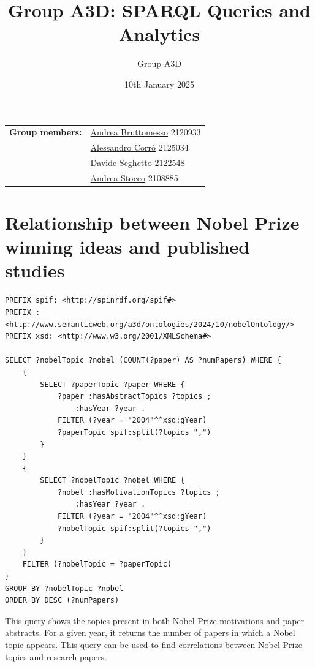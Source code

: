 \documentclass{article}
\title{Group A3D: SPARQL Queries and Analytics}
\author{Group A3D}
\date{10th January 2025}
\begin{document}
\maketitle

\begin{tabular}{@{}ll}
	\textbf{Group members:}
	 & \href{mailto:andrea.bruttomesso.1@studenti.unipd.it}{Andrea Bruttomesso} 2120933 \\
	 & \href{mailto:alessandro.corro.1@studenti.unipd.it}{Alessandro Corr\`o} 2125034   \\
	 & \href{mailto:davide.seghetto@studenti.unipd.it}{Davide Seghetto} 2122548         \\
	 & \href{mailto:andrea.stocco.8@studenti.unipd.it}{Andrea Stocco} 2108885           \\
\end{tabular}

\section{Relationship between Nobel Prize winning ideas and published studies}
\label{sec:nobelTopics}
\begin{lstlisting}
PREFIX spif: <http://spinrdf.org/spif#>
PREFIX : <http://www.semanticweb.org/a3d/ontologies/2024/10/nobelOntology/>
PREFIX xsd: <http://www.w3.org/2001/XMLSchema#>

SELECT ?nobelTopic ?nobel (COUNT(?paper) AS ?numPapers) WHERE {
    {
        SELECT ?paperTopic ?paper WHERE {
            ?paper :hasAbstractTopics ?topics ;
               	:hasYear ?year .
            FILTER (?year = "2004"^^xsd:gYear)
            ?paperTopic spif:split(?topics ",")
        }
    }
    {
        SELECT ?nobelTopic ?nobel WHERE {
            ?nobel :hasMotivationTopics ?topics ;
                :hasYear ?year .
            FILTER (?year = "2004"^^xsd:gYear)
            ?nobelTopic spif:split(?topics ",")
        }
    }
    FILTER (?nobelTopic = ?paperTopic)
}
GROUP BY ?nobelTopic ?nobel
ORDER BY DESC (?numPapers)
\end{lstlisting}

\vspace{1em}

This query shows the topics present in both Nobel Prize motivations and paper abstracts.
For a given year, it returns the number of papers in which a Nobel topic appears.
This query can be used to find correlations between Nobel Prize topics and research
papers.\\
\end{document}
